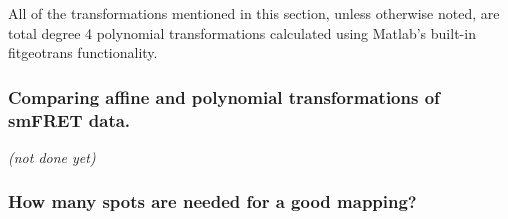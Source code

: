 \documentclass[11pt]{article}
\newcommand{\sj}[1]{\textcolor{red}{#1}}
\begin{document}
All of the transformations mentioned in this section, unless otherwise noted, are total degree 4 polynomial transformations calculated using Matlab's built-in fitgeotrans functionality.

\subsubsection{Comparing affine and polynomial transformations of smFRET data.}\label{sec:AffineVsPoly}

%
%

{\it (not done yet)}

\subsubsection{How many spots are needed for a good mapping?}
\end{document}
